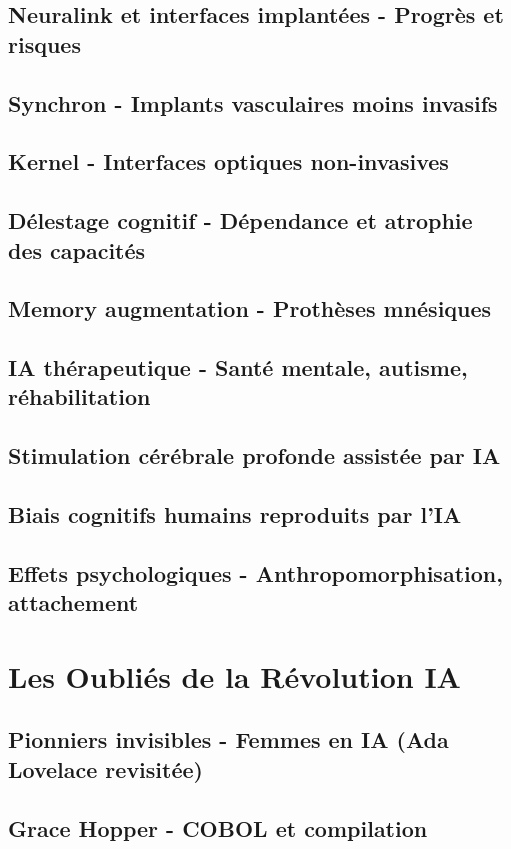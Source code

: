 \documentclass[12pt,a4paper]{book}
\begin{document}
\section{Neuralink et interfaces implantées - Progrès et risques}
\section{Synchron - Implants vasculaires moins invasifs}
\section{Kernel - Interfaces optiques non-invasives}
\section{Délestage cognitif - Dépendance et atrophie des capacités}
\section{Memory augmentation - Prothèses mnésiques}
\section{IA thérapeutique - Santé mentale, autisme, réhabilitation}
\section{Stimulation cérébrale profonde assistée par IA}
\section{Biais cognitifs humains reproduits par l'IA}
\section{Effets psychologiques - Anthropomorphisation, attachement}

\chapter{Les Oubliés de la Révolution IA}
\section{Pionniers invisibles - Femmes en IA (Ada Lovelace revisitée)}
\section{Grace Hopper - COBOL et compilation}
\end{document}
